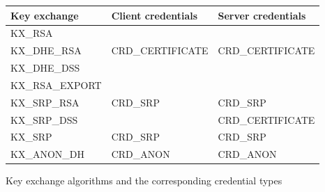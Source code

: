 \begin{figure}[hbtp]
\begin{tabular}{|l|l|p{4.5cm}|}

\hline
\bf{Key exchange} & \bf{Client credentials} & \bf{Server credentials}
\\
\hline
\hline
KX\_RSA &&
\\
\cline{1-1}
KX\_DHE\_RSA & CRD\_CERTIFICATE & CRD\_CERTIFICATE
\\
\cline{1-1}
KX\_DHE\_DSS &&
\\
\cline{1-1}
KX\_RSA\_EXPORT &&
\\
\hline
KX\_SRP\_RSA & CRD\_SRP & CRD\_SRP
\\
\cline{1-1}
KX\_SRP\_DSS && CRD\_CERTIFICATE
\\
\hline
KX\_SRP & CRD\_SRP & CRD\_SRP
\\
\hline
KX\_ANON\_DH & CRD\_ANON & CRD\_ANON
\\
\hline
\end{tabular}

\caption{Key exchange algorithms and the corresponding credential types}
\label{fig:kxcred}

\end{figure}
